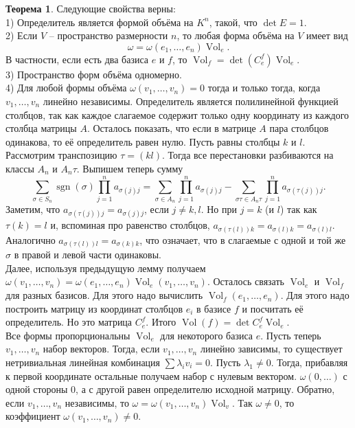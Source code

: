 \documentclass[10pt,a4paper,oneside]{book} %
\theoremstyle{definition}
\newtheorem{thm}{Теорема}
\newcommand{\Vol}{\operatorname{Vol}}
\newcommand{\sgn}{\operatorname{sgn}}
\begin{document}
\begin{thm} Следующие свойства верны:\\
1) Определитель является формой объёма на $K^n$, такой, что $\det E=1$.\\
2) Если $V$ -- пространство размерности $n$, то любая форма объёма на $V$ имеет вид $$\omega=\omega(e_1,\dots,e_n)\Vol_e.$$
В частности, если есть два базиса $e$ и $f$, то $\Vol_{f}=\det(C^f_{e}) \Vol_{e}$.\\
3) Пространство форм объёма одномерно.\\
4) Для любой формы объёма $\omega(v_1,\dots,v_n)=0$ тогда и только тогда, когда $v_1,\dots,v_n$ линейно независимы.
\proof Определитель является полилинейной функцией столбцов, так как  каждое слагаемое содержит только одну координату из каждого столбца матрицы $A$. Осталось показать, что если в матрице $A$ пара столбцов одинакова, то её определитель равен нулю. 
Пусть равны столбцы $k$ и $l$. Рассмотрим транспозицию $\tau=(kl)$. Тогда все перестановки разбиваются на классы $A_n$ и $A_n\tau$. Выпишем теперь сумму
$$\sum_{\sigma \in S_n} \sgn(\sigma)\prod_{j=1}^n a_{\sigma(j)j} = \sum_{\sigma \in A_n} \prod_{j=1}^n a_{\sigma(j)j}- \sum_{\sigma\tau \in A_n\tau} \prod_{j=1}^n a_{\sigma(\tau(j))j}.$$
Заметим, что $a_{\sigma(\tau(j))j}=a_{\sigma(j)j}$, если $j\neq k,l$. Но при  $j=k$ (и $l$) так как $\tau(k)=l$ и, вспоминая про равенство столбцов, $a_{\sigma(\tau(l))k}=a_{\sigma(l)k}=a_{\sigma(l)l}$. Аналогично $a_{\sigma(\tau(l))l}=a_{\sigma(k)k}$, что означает, что в слагаемые с одной и той же $\sigma$ в правой и левой части одинаковы.\\

Далее, используя предыдущую лемму получаем $\omega(v_1,\dots,v_n)=\omega(e_1,\dots,e_n)\Vol_e(v_1,\dots,v_n)$. Осталось связать $\Vol_e$ и $\Vol_f$ для разных базисов. Для этого надо вычислить $\Vol_f(e_1,\dots,e_n)$. Для этого надо построить матрицу из координат столбцов $e_i$ в базисе $f$ и посчитать её определитель. Но это матрица $C_{e}^f$. Итого $\Vol(f)=\det C_{e}^f\Vol_e$. \\
Все формы пропорциональны $\Vol_e$ для некоторого базиса $e$.
Пусть теперь $v_1,\dots,v_n$ набор векторов. Тогда, если $v_1,\dots,v_n$ линейно зависимы, то существует нетривиальная линейная комбинация $\sum \lambda_i v_i=0$. Пусть $\lambda_1\neq 0$. Тогда, прибавляя к первой координате остальные получаем набор с нулевым вектором. $\omega(0,\dots)$ с одной стороны 0, а с другой равен определителю исходной матрицу.
Обратно, если $v_1,\dots,v_n$ независимы, то $\omega=\omega(v_1,\dots,v_n)\Vol_v$. Так $\omega \neq 0$, то коэффициент $\omega(v_1, \dots,v_n)\neq 0$.
\endproof
\end{thm}
\end{document}
